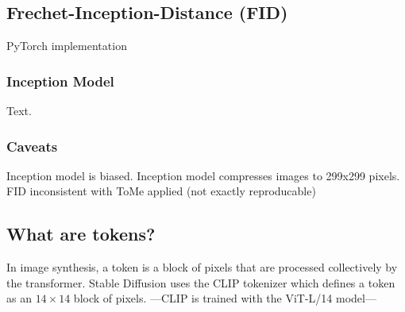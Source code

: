 \subsection{Frechet-Inception-Distance (FID)}
PyTorch implementation\cite{Seitzer2020FID}



\subsubsection{Inception Model}
Text.




\subsubsection{Caveats}
Inception model is biased. Inception model compresses images to 299x299 pixels. FID inconsistent with ToMe applied (not exactly reproducable)



\subsection{What are tokens?}
In image synthesis, a token is a block of pixels that are processed collectively by the transformer. Stable Diffusion uses the CLIP tokenizer\cite{radford2021learning} which defines a token as an $14 \times 14$ block of pixels. ---CLIP is trained with the ViT-L/14 model---
